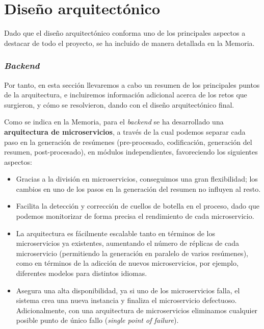 \newpage

\section{Diseño arquitectónico}

Dado que el diseño arquitectónico conforma uno de los principales aspectos a destacar de todo el proyecto, se ha incluido de manera detallada en la Memoria.

\subsubsection{\Large \emph{Backend}}

Por tanto, en esta sección llevaremos a cabo un resumen de los principales puntos de la arquitectura, e incluiremos información adicional acerca de los retos que surgieron, y cómo se resolvieron, dando con el diseño arquitectónico final.

Como se indica en la Memoria, para el \emph{backend} se ha desarrollado una \textbf{arquitectura de microservicios}, a través de la cual podemos separar cada paso en la generación de resúmenes (pre-procesado, codificación, generación del resumen, post-procesado), en módulos independientes, favoreciendo los siguientes aspectos:

\vspace{-0.2cm}
\begin{itemize} [\textbullet]
	\item Gracias a la división en microservicios, conseguimos una gran flexibilidad; los cambios en uno de los pasos en la generación del resumen no influyen al resto.
	
	\item Facilita la detección y corrección de cuellos de botella en el proceso, dado que podemos monitorizar de forma precisa el rendimiento de cada microservicio.
	
	\item La arquitectura es fácilmente escalable tanto en términos de los microservicios ya existentes, aumentando el número de réplicas de cada microservicio (permitiendo la generación en paralelo de varios resúmenes), como en términos de la adicción de nuevos microservicios, por ejemplo, diferentes modelos para distintos idiomas.
	
	\item Asegura una alta disponibilidad, ya si uno de los microservicios falla, el sistema crea una nueva instancia y finaliza el microservicio defectuoso. Adicionalmente, con una arquitectura de microservicios eliminamos cualquier posible punto de único fallo (\emph{single point of failure}).
\end{itemize}


